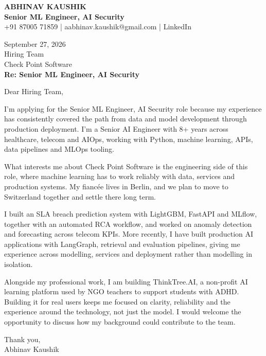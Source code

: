 \documentclass[10pt,a4paper]{article}
\begin{document}
\begin{center}
{\Large\bfseries ABHINAV KAUSHIK}\\[2pt]
{\bfseries Senior ML Engineer, AI Security}\\[2pt]
+91 87005 71859 \quad | \quad aabhinav.kaushik@gmail.com \quad | \quad LinkedIn
\end{center}
\vspace{8pt}
September 27, 2026\\[6pt]
Hiring Team\\
Check Point Software\\[4pt]
\textbf{Re: Senior ML Engineer, AI Security}

Dear Hiring Team,

I’m applying for the Senior ML Engineer, AI Security role because my experience has consistently covered the path from data and model development through production deployment. I’m a Senior AI Engineer with 8+ years across healthcare, telecom and AIOps, working with Python, machine learning, APIs, data pipelines and MLOps tooling.

What interests me about Check Point Software is the engineering side of this role, where machine learning has to work reliably with data, services and production systems. My fiancée lives in Berlin, and we plan to move to Switzerland together and settle there long term.

I built an SLA breach prediction system with LightGBM, FastAPI and MLflow, together with an automated RCA workflow, and worked on anomaly detection and forecasting across telecom KPIs. More recently, I have built production AI applications with LangGraph, retrieval and evaluation pipelines, giving me experience across modelling, services and deployment rather than modelling in isolation.

Alongside my professional work, I am building ThinkTree.AI, a non-profit AI learning platform used by NGO teachers to support students with ADHD. Building it for real users keeps me focused on clarity, reliability and the experience around the technology, not just the model. I would welcome the opportunity to discuss how my background could contribute to the team.

Thank you,\\
Abhinav Kaushik
\end{document}

